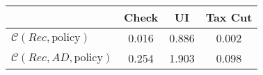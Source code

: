 \begin{tabular}{@{}lccc@{}} 
\toprule 
                          & Check      & UI    & Tax Cut    \\  \midrule 
$\mathcal{C}(Rec,\text{policy})$ & 0.016  & 0.886  & 0.002     \\ 
$\mathcal{C}(Rec, AD,\text{policy})$ & 0.254  & 1.903  & 0.098     \\ 
\end{tabular}  
